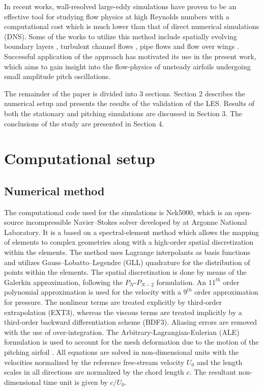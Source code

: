 In recent works, wall-resolved large-eddy simulations have proven to be an effective tool for studying flow physics at high Reynolds numbers with a computational cost which is much lower than that of direct numerical simulations (DNS). Some of the works to utilize this method include spatially evolving boundary layers \citep{eitel14}, turbulent channel flows \citep{schlatter06,schlatter06b}, pipe flows \citep{chin15} and flow over wings \citep{uzun10,lombard15}. Successful application of the approach has motivated its use in the present work, which aims to gain insight into the flow-physics of unsteady airfoils undergoing small amplitude pitch oscillations.

The remainder of the paper is divided into 3 sections. Section 2 describes the numerical setup and presents the results of the validation of the LES. Results of both the stationary and pitching simulations are discussed in Section 3. The conclusions of the study are presented in Section 4.

\section{Computational setup}

\subsection{Numerical method}

The computational code used for the simulations is Nek5000, which is an open-source incompressible Navier--Stokes solver developed by \cite{nek5000} at Argonne National Laboratory. It is a based on a spectral-element method which allows the mapping of elements to complex geometries along with a high-order spatial discretization within the elements. The method uses Lagrange interpolants as basis functions and utilizes Gauss--Lobatto--Legendre (GLL) quadrature for the distribution of points within the elements. The spatial discretization is done by means of the Galerkin approximation, following the $P_{N}$-$P_{N-2}$ formulation\citep{maday89}. An $11^{th}$ order polynomial approximation is used for the velocity with a $9^{th}$ order approximation for pressure. The nonlinear terms are treated explicitly by third-order extrapolation (EXT3), whereas the viscous terms are treated implicitly by a third-order backward differentiation scheme (BDF3). Aliasing errors are removed with the use of over-integration. The Arbitrary-Lagrangian-Eulerian (ALE) formulation is used to account for the mesh deformation due to the motion of the pitching airfoil \citep{ho90,ho91}. All equations are solved in non-dimensional units with the velocities normalized by the reference free-stream velocity $U_{0}$ and the length scales in all directions are normalized by the chord length $c$. The resultant non-dimensional time unit is given by $c/U_{0}$.
